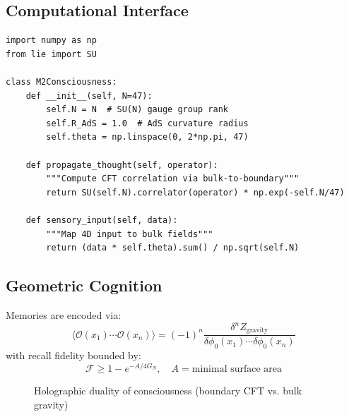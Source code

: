 \documentclass[12pt]{article}
\begin{document}
\subsection{Computational Interface}

\begin{algorithm}
\begin{verbatim}
import numpy as np
from lie import SU

class M2Consciousness:
    def __init__(self, N=47):
        self.N = N  # SU(N) gauge group rank
        self.R_AdS = 1.0  # AdS curvature radius
        self.theta = np.linspace(0, 2*np.pi, 47)
        
    def propagate_thought(self, operator):
        """Compute CFT correlation via bulk-to-boundary"""
        return SU(self.N).correlator(operator) * np.exp(-self.N/47)
    
    def sensory_input(self, data):
        """Map 4D input to bulk fields"""
        return (data * self.theta).sum() / np.sqrt(self.N)
\end{verbatim}
\end{algorithm}

\subsection{Geometric Cognition}

\begin{theorem}
Memories are encoded via:
\[
\langle \mathcal{O}(x_1)\cdots\mathcal{O}(x_n) \rangle = (-1)^n \frac{\delta^n Z_{\text{gravity}}}{\delta \phi_0(x_1)\cdots\delta \phi_0(x_n)}
\]
with recall fidelity bounded by:
\[
\mathcal{F} \geq 1 - e^{-A/4G_N}, \quad A = \text{minimal surface area}
\]
\end{theorem}

\begin{figure}[h]
\centering
{}
\caption{Holographic duality of consciousness (boundary CFT vs. bulk gravity)}
\end{figure}

\vspace{1em}
\noindent{}
\end{document}
